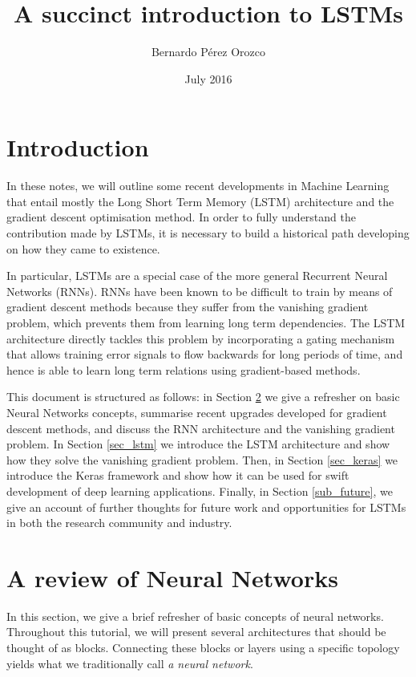 \documentclass[pdftex,11pt,a4paper]{article}
\title{A succinct introduction to LSTMs}
\author{Bernardo P\'erez Orozco}
\date{July 2016}
\theoremstyle{definition}
\theoremstyle{remark}
\begin{document}
\maketitle

\section{Introduction}
In these notes, we will outline some recent developments in Machine Learning that entail mostly the Long Short Term Memory (LSTM) architecture and the gradient descent optimisation method. In order to fully understand the contribution made by LSTMs, it is necessary to build a historical path developing on how they came to existence.

\par In particular, LSTMs are a special case of the more general Recurrent Neural Networks (RNNs). RNNs have been known to be difficult to train by means of gradient descent methods because they suffer from the vanishing gradient problem, which prevents them from learning long term dependencies. The LSTM architecture directly tackles this problem by incorporating a gating mechanism that allows training error signals to flow backwards for long periods of time, and hence is able to learn long term relations using gradient-based methods.

\par This document is structured as follows: in Section \ref{sec_path} we give a refresher on basic Neural Networks concepts, summarise recent upgrades developed for gradient descent methods, and discuss the RNN architecture and the vanishing gradient problem. In Section \ref{sec_lstm} we introduce the LSTM architecture and show how they solve the vanishing gradient problem. Then, in Section \ref{sec_keras} we introduce the Keras framework and show how it can be used for swift development of deep learning applications. Finally, in Section \ref{sub_future}, we give an account of further thoughts for future work and opportunities for LSTMs in both the research community and industry.

\section{A review of Neural Networks} \label{sec_path}
In this section, we give a brief refresher of basic concepts of neural networks. Throughout this tutorial, we will present several architectures that should be thought of as blocks. Connecting these blocks or layers using a specific topology yields what we traditionally call \textit{a neural network}. 
\end{document}
